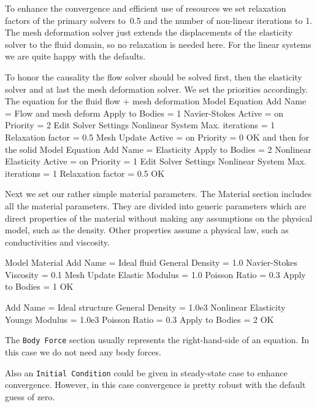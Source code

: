 To enhance the convergence and efficient use of resources 
we set relaxation factors of the primary solvers to~0.5 and the 
number of non-linear iterations to 1. The mesh deformation solver just extends the 
displacements of the elasticity solver to the fluid domain, so no relaxation is needed here. 
For the linear systems we are quite happy with the defaults.

To honor the causality the flow solver should be solved first, then the elasticity solver and
at last the mesh deformation solver. We set the priorities accordingly. 
\\
\noindent
The equation for the fluid flow + mesh deformation
\ttbegin
Model
  Equation
    Add
    Name = Flow and mesh deform
    Apply to Bodies = 1
    Navier-Stokes
      Active = on
      Priority = 2 
      Edit Solver Settings
        Nonlinear System
          Max. iterations = 1
          Relaxation factor = 0.5
    Mesh Update
      Active = on
      Priority = 0 
    OK
\ttend        
and then for the solid
\ttbegin
Model
  Equation
    Add
    Name = Elasticity
    Apply to Bodies = 2
    Nonlinear Elasticity
      Active = on
      Priority = 1
      Edit Solver Settings
        Nonlinear System
          Max. iterations = 1
          Relaxation factor = 0.5
    OK
\ttend    

Next we set our rather simple material parameters.
The Material section includes all the material parameters.
They are divided into generic parameters which are direct properties of the material
without making any assumptions on the physical model, such as the density. Other properties assume
a physical law, such as conductivities and viscosity. 

\ttbegin
Model
  Material
    Add
    Name = Ideal fluid 
    General 
      Density = 1.0
    Navier-Stokes
      Viscosity = 0.1
    Mesh Update
      Elastic Modulus = 1.0
      Poisson Ratio = 0.3  
    Apply to Bodies = 1 
    OK

    Add  
    Name = Ideal structure
    General 
      Density = 1.0e3
    Nonlinear Elasticity
      Youngs Modulus = 1.0e3
      Poisson Ratio = 0.3
    Apply to Bodies = 2
    OK
\ttend

The \texttt{Body Force} section usually represents the right-hand-side of an equation.
In this case we do not need any body forces.

Also an \texttt{Initial Condition} could be given in steady-state case to enhance convergence. However,
in this case convergence is pretty robust with the default guess of zero.

